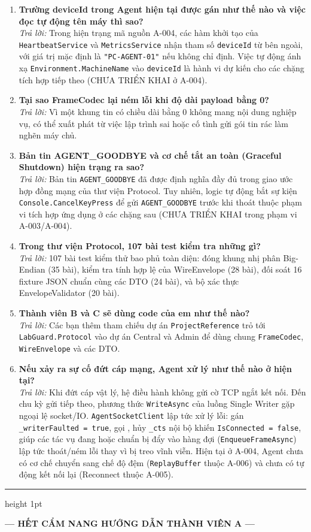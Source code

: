 \documentclass[12pt,a4paper]{article}
\begin{document}
\begin{enumerate}[leftmargin=*, label=\textbf{Câu \arabic*:}]
  \item \textbf{Trường deviceId trong Agent hiện tại được gán như thế nào và việc đọc tự động tên máy thì sao?} \\
    \textit{Trả lời:} Trong hiện trạng mã nguồn A-004, các hàm khởi tạo của \texttt{HeartbeatService} và \texttt{MetricsService} nhận tham số \texttt{deviceId} từ bên ngoài, với giá trị mặc định là \texttt{"PC-AGENT-01"} nếu không chỉ định. Việc tự động ánh xạ \texttt{Environment.MachineName} vào \texttt{deviceId} là hành vi dự kiến cho các chặng tích hợp tiếp theo (CHƯA TRIỂN KHAI ở A-004).
  \item \textbf{Tại sao FrameCodec lại ném lỗi khi độ dài payload bằng 0?} \\
    \textit{Trả lời:} Vì một khung tin có chiều dài bằng 0 không mang nội dung nghiệp vụ, có thể xuất phát từ việc lập trình sai hoặc cố tình gửi gói tin rác làm nghẽn máy chủ.
  \item \textbf{Bản tin AGENT\_GOODBYE và cơ chế tắt an toàn (Graceful Shutdown) hiện trạng ra sao?} \\
    \textit{Trả lời:} Bản tin \texttt{AGENT\_GOODBYE} đã được định nghĩa đầy đủ trong giao ước hợp đồng mạng của thư viện Protocol. Tuy nhiên, logic tự động bắt sự kiện \texttt{Console.CancelKeyPress} để gửi \texttt{AGENT\_GOODBYE} trước khi thoát thuộc phạm vi tích hợp ứng dụng ở các chặng sau (CHƯA TRIỂN KHAI trong phạm vi A-003/A-004).
  \item \textbf{Trong thư viện Protocol, 107 bài test kiểm tra những gì?} \\
    \textit{Trả lời:} 107 bài test kiểm thử bao phủ toàn diện: đóng khung nhị phân Big-Endian (35 bài), kiểm tra tính hợp lệ của WireEnvelope (28 bài), đối soát 16 fixture JSON chuẩn cùng các DTO (24 bài), và bộ xác thực EnvelopeValidator (20 bài).
  \item \textbf{Thành viên B và C sẽ dùng code của em như thế nào?} \\
    \textit{Trả lời:} Các bạn thêm tham chiếu dự án \texttt{ProjectReference} trỏ tới \texttt{LabGuard.Protocol} vào dự án Central và Admin để dùng chung \texttt{FrameCodec}, \texttt{WireEnvelope} và các DTO.
  \item \textbf{Nếu xảy ra sự cố đứt cáp mạng, Agent xử lý như thế nào ở hiện tại?} \\
    \textit{Trả lời:} Khi đứt cáp vật lý, hệ điều hành không gửi cờ TCP ngắt kết nối. Đến chu kỳ gửi tiếp theo, phương thức \texttt{WriteAsync} của luồng Single Writer gặp ngoại lệ socket/IO. \texttt{AgentSocketClient} lập tức xử lý lỗi: gán \texttt{\_writerFaulted = true}, gọi , hủy \texttt{\_cts} nội bộ khiến \texttt{IsConnected = false}, giúp các tác vụ đang hoặc chuẩn bị đẩy vào hàng đợi (\texttt{EnqueueFrameAsync}) lập tức thoát/ném lỗi thay vì bị treo vĩnh viễn. Hiện tại ở A-004, Agent chưa có cơ chế chuyển sang chế độ đệm (\texttt{ReplayBuffer} thuộc A-006) và chưa có tự động kết nối lại (Reconnect thuộc A-005).
\end{enumerate}

\begin{center}
  \vspace{10mm}
  {\color{lgDeepBlue}\hrule height 1pt}
  \vspace{4mm}
  {\bfseries\color{lgSlate} — HẾT CẨM NANG HƯỚNG DẪN THÀNH VIÊN A —\par}
\end{center}
\end{document}
